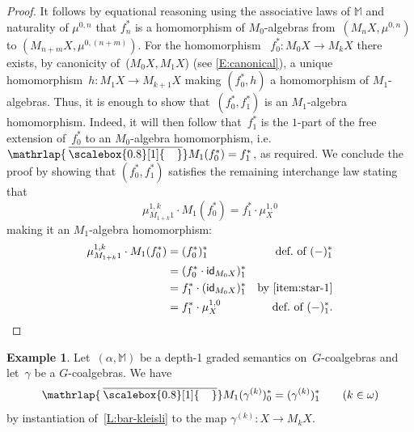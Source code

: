 \documentclass[sigconf,
			final%
			nonacm
                        ]{acmart}
\numberwithin{equation}{section}
\numberwithin{equation}{section}
\theoremstyle{plain}
\theoremstyle{definition}
\newtheorem{expl}[thm]{Example}
\newcommand{\mybar}[3]{%
  \mathrlap{\hspace{#2}\overline{\scalebox{#1}[1]{\hphantom{\ensuremath{#3}}\vphantom{\rule{0pt}{5.5pt}}}}}\ensuremath{#3}
}
\newcommand{\barM}{\mybar{0.8}{2pt}{M}_1}
\newcommand{\id}{\mathsf{id}}
\newcommand{\M}{\mathbb{M}}                   %
\begin{document}
\begin{proof}
    It follows by equational reasoning using the associative laws
    of $\M$ and naturality of $\mu^{0,n}$ that $f^*_n$
    is a homomorphism of $M_0$-algebras from~$(M_nX, \mu^{0,n})$
    to $(M_{n+m}X, \mu^{0, (n+m)})$. For the homomorphism%
    ~$f^*_0\colon M_0X\to M_kX$ there exists, by canonicity
    of~($M_0X, M_1X$) (see \cref{E:canonical}), a unique
    homomorphism~$h\colon M_1X\to M_{k+1}X$ making
    $(f^*_0, h)$ a homomorphism of $M_1$-algebras.
    Thus, it is enough to show that~$(f^*_0, f^*_1)$ is an
    $M_1$-algebra homomorphism.  Indeed, it will then follow
    that~$f^*_1$ is the $1$-part of the free extension of~$f^*_0$
    to an $M_0$-algebra homomorphism, i.e.~$\barM(f^*_0) = f^*_1$,
    as required.
    We conclude the proof by showing that
    $(f^*_0, f^*_1)$ satisfies the remaining interchange law stating that
    \[
      \mu^{1,k}_{M_{1+k}1}\cdot M_1(f^*_0) = f^*_1\cdot \mu^{1, 0}_X
    \]
    making it an $M_1$-algebra homomorphism:
    \begin{align*}
      \mu^{1,k}_{M_{1+k}1} \cdot M_1(f^*_0)
      &= (f_0^*)^*_1 & \text{def.~of $(-)^*_1$} \\
      &= (f_0^* \cdot \id_{M_0 X})^*_1 \\
      &= f_1^* \cdot (\id_{M_0 X})^*_1 & \text{by~\eqref{item:star-1}} \\
      &= f^*_1 \cdot \mu^{1,0}_X & \text{def.~of $(-)^*_1$}.
    \end{align*}
\end{proof}

\begin{expl}
Let~$(\alpha, \M)$ be a depth-1 graded semantics
on~$G$-coalgebras and let~$\gamma$ be a $G$-coalgebras.
We have
\begin{equation}
\barM(\gamma^{(k)})^*_0 = (\gamma^{(k)})^*_1		\tag{$k\in\omega$}
\end{equation}
by instantiation of~\cref{L:bar-kleisli} to the map
$\gamma^{(k)}\colon X\to M_kX$.
\end{expl}
\end{document}
